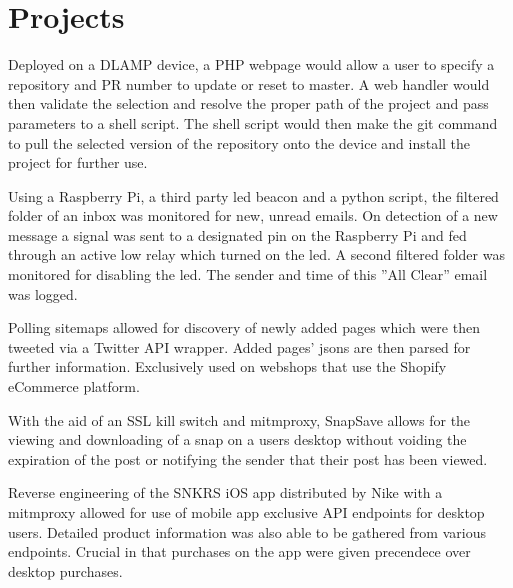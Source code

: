 \documentclass[]{deedy-resume-openfont}
\begin{document}
\begin{minipage}[t]{0.67\textwidth}

\section{Projects}
Deployed on a DLAMP device, a PHP webpage would allow a user to specify a repository and PR number to update or reset to master. A web handler would then validate the selection and resolve the proper path of the project and pass parameters to a shell script. The shell script would then make the git command to pull the selected version of the repository onto the device and install the project for further use.
\sectionsep

Using a Raspberry Pi, a third party led beacon and a python script, the filtered folder
of an inbox was monitored for new, unread emails. On detection of a new message a
signal was sent to a designated pin on the Raspberry Pi and fed through an active low
relay which turned on the led. A second filtered folder was monitored for disabling
the led. The sender and time of this ”All Clear” email was logged.
\sectionsep

Polling sitemaps allowed for discovery of newly added pages which were then tweeted via a Twitter API wrapper.
Added pages' jsons are then
parsed for further information.
Exclusively used on webshops
that use the Shopify eCommerce platform.
\sectionsep


With the aid of an SSL kill switch and mitmproxy, SnapSave allows for the viewing and
downloading of a snap on a users desktop without voiding the expiration of the post
or notifying the sender that their post has been viewed.
\sectionsep

Reverse engineering of the SNKRS iOS app distributed by Nike with a mitmproxy
allowed for use of mobile app exclusive API endpoints for desktop users. Detailed
product information was also able to be gathered from various endpoints. Crucial in
that purchases on the app were given precendece over desktop purchases.
\sectionsep
\end{minipage} 
\end{document}
